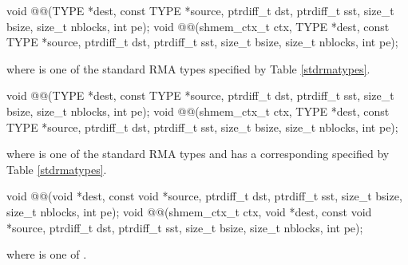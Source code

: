 
\begin{apidefinition}

\begin{C11synopsis}
void @@(TYPE *dest, const TYPE *source, ptrdiff_t dst, ptrdiff_t sst, size_t bsize, size_t nblocks, int pe);
void @@(shmem_ctx_t ctx, TYPE *dest, const TYPE *source, ptrdiff_t dst, ptrdiff_t sst, size_t bsize, size_t nblocks, int pe);
\end{C11synopsis}
where \TYPE{} is one of the standard \ac{RMA} types specified by Table \ref{stdrmatypes}.

\begin{Csynopsis}
void @@(TYPE *dest, const TYPE *source, ptrdiff_t dst, ptrdiff_t sst, size_t bsize, size_t nblocks, int pe);
void @@(shmem_ctx_t ctx, TYPE *dest, const TYPE *source, ptrdiff_t dst, ptrdiff_t sst, size_t bsize, size_t nblocks, int pe);
\end{Csynopsis}
where \TYPE{} is one of the standard \ac{RMA} types and has a corresponding \TYPENAME{} specified by Table \ref{stdrmatypes}.

\begin{CsynopsisCol}
void @@(void *dest, const void *source, ptrdiff_t dst, ptrdiff_t sst, size_t bsize, size_t nblocks, int pe);
void @@(shmem_ctx_t ctx, void *dest, const void *source, ptrdiff_t dst, ptrdiff_t sst, size_t bsize, size_t nblocks, int pe);
\end{CsynopsisCol}
where \SIZE{} is one of .


\end{apidefinition}
